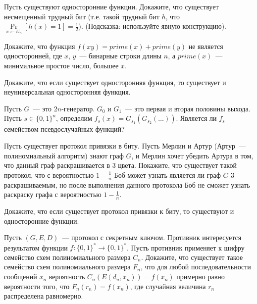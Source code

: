 \setcounter{curtask}{33}


\begin{task}
    Пусть существуют односторонние функции. Докажите, что существует несмещенный
    трудный бит (т.е. такой трудный бит $h$, что $\Pr\limits_{x \gets U_n}[h(x) = 1]
    = \frac{1}{2}$). (Подсказка: используйте явную конструкцию). 
\end{task}

\breakline

\begin{ptask}{12}
    Докажите, что функция $f(xy) = prime(x) + prime(y)$ не является односторонней,
    где $x$, $y$~--- бинарные строки длины $n$, а $prime(x)$~--- минимальное простое
    число, большее $x$.
\end{ptask}

\begin{ptask}{28}
    Докажите, что если существует односторонняя функция, то существует и
    неуниверсальная односторонняя функция.
\end{ptask}

\begin{ptask}{31}
    Пусть $G$~--- это $2n$-генератор. $G_0$ и $G_1$~--- это первая и вторая половины
    выхода. Пусть $s \in \{0, 1\}^n$, определим $f_s(x) =
    G_{s_1}(G_{s_2}(\dots))$. Является ли $f_s$ семейством псевдослучайных функций?
\end{ptask}


\begin{ptask}{33}
    Пусть существует протокол привязки в биту. Пусть Мерлин и Артур (Артур~---
    полиномиальный алгоритм) знают граф $G$, и Мерлин хочет убедить Артура в том, что
    данный граф раскрашивается в $3$ цвета. Покажите, что существует такой протокол,
    что с вероятностью $1 - \frac{1}{n}$ Боб может узнать является ли граф $G$ $3$
    раскрашиваемым, но после выполнения данного протокола Боб не сможет узнать
    раскраску графа с вероятностью $1 - \frac{1}{n}$.
\end{ptask}

\begin{ptask}{34}
    Докажите, что если существует протокол привязки к биту, то существуют и
    односторонние функции.
\end{ptask}

\begin{ptask}{35}
    Пусть $(G, E, D)$~--- протокол с секретным ключом. Противник интересуется
    результатом функции $f: \{0, 1\}^* \to \{0, 1\}^*$. Пусть противник применяет к
    шифру семейство схем полиномиального размера $C_n$. Докажите, что существует
    такое семейство схем полиномиального размера $F_n$, что для любой
    последовательности сообщений $x_n$ вероятность $C_n(E(d_n, x_n)) = f(x_n)$
    примерно равно вероятности того, что $F_n(r_n) = f(x_n)$, где случайная величина
    $r_n$ распределена равномерно.
\end{ptask}